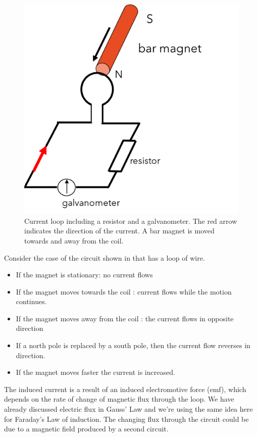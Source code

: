 \documentclass[
]{book}
\numberwithin{equation}{section}
\begin{document}
\begin{figure}

{\centering \includegraphics[width=0.7\linewidth]{Figures/circuit_GR} 

}

\caption{Current loop including a resistor and a galvanometer. The red arrow indicates the direction of the current. A bar magnet is moved towards and away from the coil.}\label{fig:circuitGR}
\end{figure}

Consider the case of the circuit shown in that has a loop of wire.

\begin{itemize}
\item
  If the magnet is stationary: no current flows
\item
  If the magnet moves towards the coil : current flows while the
  motion continues.
\item
  If the magnet moves away from the coil : the current flows in
  opposite direction
\item
  If a north pole is replaced by a south pole, then the current flow
  reverses in direction.
\item
  If the magnet moves faster the current is increased.
\end{itemize}

The induced current is a result of an induced electromotive force (emf),
which depends on the rate of change of magnetic flux through the loop.
We have already discussed electric flux in Gauss' Law and we're using
the same idea here for Faraday's Law of induction. The changing flux
through the circuit could be due to a magnetic field produced by a
second circuit.
\end{document}
